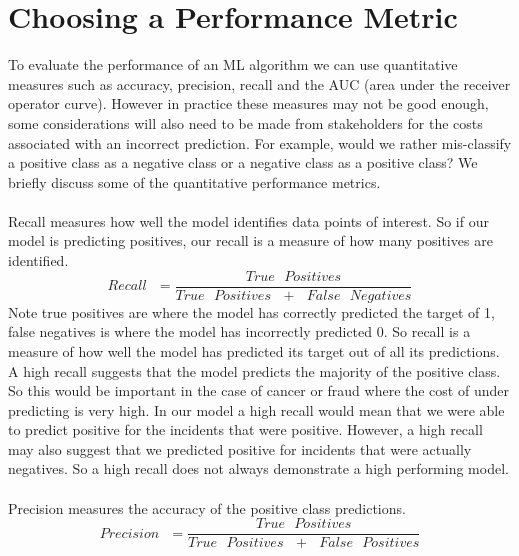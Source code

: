 \documentclass[11pt, oneside]{article}   	%
\begin{document}
\section{Choosing a Performance Metric}\label{sec:sec1}
To evaluate the performance of an ML algorithm we can use quantitative measures such as accuracy, precision, recall and the AUC (area under the receiver operator curve). However in practice these measures may not be good enough, some considerations will also need to be made from stakeholders for the costs associated with an incorrect prediction. For example, would we rather mis-classify a positive class as a negative class or a negative class as a positive class? We briefly discuss some of the quantitative performance metrics.
\\ \\
Recall measures how well the model identifies data points of interest. So if our model is predicting positives, our recall is a measure of how many positives are identified. 
\begin{equation}\label{recall}
Recall\text{ } = \frac{True \text{ }Positives}{True \text{ }Positives\text{ } +\text{ } False \text{ }Negatives}
\end{equation}
Note true positives are where the model has correctly predicted the target of 1, false negatives is where the model has incorrectly predicted 0. So recall is a measure of how well the model has predicted its target out of all its predictions. A high recall suggests that the model predicts the majority of the positive class. So this would be important in the case of cancer or fraud where the cost of under predicting is very high. In our model a high recall would mean that we were able to predict positive for the incidents that were positive. However, a high recall may also suggest that we predicted positive for incidents that were actually negatives. So a high recall does not always demonstrate a high performing model.
\\ \\
Precision measures the accuracy of the positive class predictions.
\begin{equation}\label{precision}
Precision\text{ } = \frac{True\text{ } Positives}{True\text{ } Positives\text{ } +\text{ } False\text{ } Positives}
\end{equation}
\end{document}
